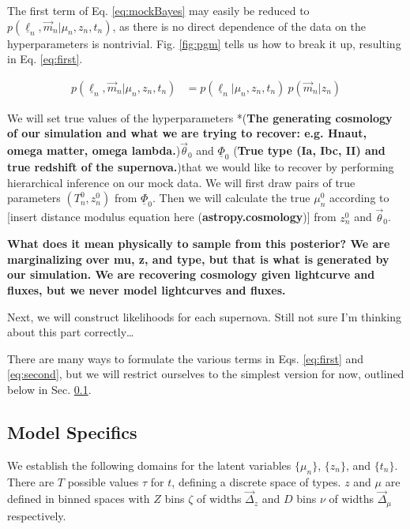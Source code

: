 \documentclass[12pt, onecolumn]{emulateapj}
\newcommand{\textul}{\underline}
\begin{document}
The first term of Eq. \ref{eq:mockBayes} may easily be reduced to $p(\textul{\ell}_{n}, \vec{m}_{n} | \mu_{n}, z_{n}, t_{n})$, as there is no direct dependence of the data on the hyperparameters is nontrivial.  Fig. \ref{fig:pgm} tells us how to break it up, resulting in Eq. \ref{eq:first}.

\begin{align}
\label{eq:first}
p(\textul{\ell}_{n}, \vec{m}_{n} | \mu_{n}, z_{n}, t_{n}) &= p(\textul{\ell}_{n} | \mu_{n}, z_{n}, t_{n})\ p(\vec{m}_{n} | z_{n})
\end{align}

We will set true values of the hyperparameters *({\bf The generating cosmology of our simulation and what we are trying to recover: e.g. Hnaut, omega matter, omega lambda.})$\vec{\theta}_{0}$ and $\textul{\Phi}_{0}$ ({\bf True type (Ia, Ibc, II) and true redshift of the supernova.})that we would like to recover by performing hierarchical inference on our mock data.  We will first draw pairs of true parameters $(T_{n}^{0}, z_{n}^{0})$ from $\textul{\Phi}_{0}$.  Then we will calculate the true $\mu_{n}^{0}$ according to [insert distance modulus equation here ({\bf astropy.cosmology})] from $z_{n}^{0}$ and $\vec{\theta}_{0}$.
 
 {\bf What does it mean physically to sample from this posterior?  We are marginalizing over mu, z, and type, but that is what is generated by our simulation. We are recovering cosmology given lightcurve and fluxes, but we never model lightcurves and fluxes.}
  		  
 Next, we will construct likelihoods for each supernova.  Still not sure I'm thinking about this part correctly\dots

There are many ways to formulate the various terms in Eqs. \ref{eq:first} and \ref{eq:second}, but we will restrict ourselves to the simplest version for now, outlined below in Sec. \ref{sec:choices}.  

\subsection{Model Specifics}
\label{sec:choices}

We establish the following domains for the latent variables $\{\mu_{n}\}$, $\{z_{n}\}$, and $\{t_{n}\}$.  There are $T$ possible values $\tau$ for $t$, defining a discrete space of types.  $z$ and $\mu$ are defined in binned spaces with $Z$ bins $\zeta$ of widths $\vec{\Delta}_{z}$ and $D$ bins $\nu$ of widths $\vec{\Delta}_{\mu}$ respectively.  
\end{document}
